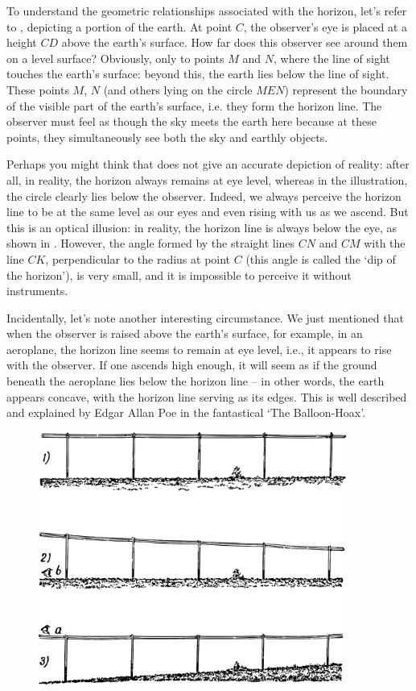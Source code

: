 To understand the geometric relationships associated with the horizon, let's refer to , depicting a portion of the earth. At point $C$, the observer's eye is placed at a height $CD$ above the earth's surface. How far does this observer see around them on a level surface? Obviously, only to points $M$ and $N$, where the line of sight touches the earth's surface: beyond this, the earth lies below the line of sight. These points $M$, $N$ (and others lying on the circle $MEN$) represent the boundary of the visible part of the earth's surface, i.e. they form the horizon line. The observer must feel as though the sky meets the earth here because at these points, they simultaneously see both the sky and earthly objects.

Perhaps you might think that  does not give an accurate depiction of reality: after all, in reality, the horizon always remains at eye level, whereas in the illustration, the circle clearly lies below the observer. Indeed, we always perceive the horizon line to be at the same level as our eyes and even rising with us as we ascend. But this is an optical illusion: in reality, the horizon line is always below the eye, as shown in . However, the angle formed by the straight lines $CN$ and $CM$ with the line $CK$, perpendicular to the radius at point $C$ (this angle is called the `dip of the horizon'), is very small, and it is impossible to perceive it without instruments.

Incidentally, let's note another interesting circumstance. We just mentioned that when the observer is raised above the earth's surface, for example, in an aeroplane, the horizon line seems to remain at eye level, i.e., it appears to rise with the observer. If one ascends high enough, it will seem as if the ground beneath the aeroplane lies below the horizon line -- in other words, the earth appears concave, with the horizon line serving as its edges. This is well described and explained by Edgar Allan Poe in the fantastical `The Balloon-Hoax'.

\begin{figure}[h!]
\centering
\includegraphics[width=0.9\textwidth]{figures/ch-06/fig-099.pdf}
\end{figure}

